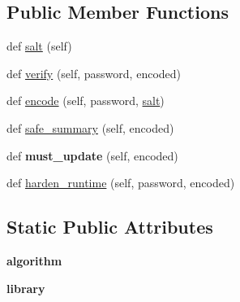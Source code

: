 \subsection*{Public Member Functions}
\begin{DoxyCompactItemize}
\item 
def \mbox{\hyperlink{classdjango_1_1contrib_1_1auth_1_1hashers_1_1_base_password_hasher_a6761698d81d6070e4aa046fe6b7116f7}{salt}} (self)
\item 
def \mbox{\hyperlink{classdjango_1_1contrib_1_1auth_1_1hashers_1_1_base_password_hasher_a6edb32933f71ee82ef20a996c95a5a6f}{verify}} (self, password, encoded)
\item 
def \mbox{\hyperlink{classdjango_1_1contrib_1_1auth_1_1hashers_1_1_base_password_hasher_a07f2489811cde85cc4c358e760a8aa57}{encode}} (self, password, \mbox{\hyperlink{classdjango_1_1contrib_1_1auth_1_1hashers_1_1_base_password_hasher_a6761698d81d6070e4aa046fe6b7116f7}{salt}})
\item 
def \mbox{\hyperlink{classdjango_1_1contrib_1_1auth_1_1hashers_1_1_base_password_hasher_a8ae674a5aed2af797992225ef54bd92f}{safe\+\_\+summary}} (self, encoded)
\item 
\mbox{\label{classdjango_1_1contrib_1_1auth_1_1hashers_1_1_base_password_hasher_ac252e189eae21db9dfb86d3689098c21}} 
def {\bfseries must\+\_\+update} (self, encoded)
\item 
def \mbox{\hyperlink{classdjango_1_1contrib_1_1auth_1_1hashers_1_1_base_password_hasher_a27314eb8970ea374878869186f4eac08}{harden\+\_\+runtime}} (self, password, encoded)
\end{DoxyCompactItemize}
\subsection*{Static Public Attributes}
\begin{DoxyCompactItemize}
\item 
\mbox{\label{classdjango_1_1contrib_1_1auth_1_1hashers_1_1_base_password_hasher_acae8157065b8bf9e0e237e6ea46ed371}} 
{\bfseries algorithm}
\item 
\mbox{\label{classdjango_1_1contrib_1_1auth_1_1hashers_1_1_base_password_hasher_a708c097faaaad1757980cbe4eb3fcc24}} 
{\bfseries library}
\end{DoxyCompactItemize}


